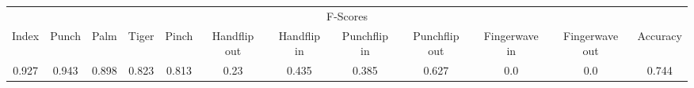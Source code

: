 \documentclass{standalone}
\begin{document}
 
 \begin{tabular}{|c|c|c|c|c|c|c|c|c|c|c ||c|}
\cline{1-12}\multicolumn{12}{|c|}{F-Scores} \\ 
\cline{1-12}Index & Punch & Palm & Tiger & Pinch & Handflip out & Handflip in & Punchflip in & Punchflip out & Fingerwave in & Fingerwave out & Accuracy\\ 
\cline{1-12}0.927 & 0.943 & 0.898 & 0.823 & 0.813 & 0.23 & 0.435 & 0.385 & 0.627 & 0.0 & 0.0 & 0.744\\ 
 \cline{1-12}\hline \end{tabular}
 
\end{document}
